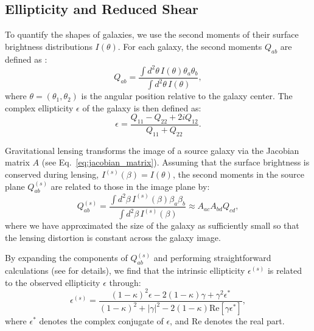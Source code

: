 \subsection{Ellipticity and Reduced Shear}
To quantify the shapes of galaxies, we use the second moments of their surface brightness distributions $I(\theta)$. For each galaxy, the second moments $Q_{ab}$ are defined as \citep{2001PhR...340..291B}:
\begin{equation}
    Q_{ab} = \frac{\int d^2\theta\, I(\theta) \theta_a \theta_b}{\int d^2\theta\, I(\theta)},
    \label{eq:second_moments}
\end{equation}
where $\theta = (\theta_1, \theta_2)$ is the angular position relative to the galaxy center. The complex ellipticity $\epsilon$ of the galaxy is then defined as:
\begin{equation}
    \epsilon = \frac{Q_{11} - Q_{22} + 2i Q_{12}}{Q_{11} + Q_{22}}.
    \label{eq:complex_ellipticity}
\end{equation}

Gravitational lensing transforms the image of a source galaxy via the Jacobian matrix $A$ (see Eq.~\eqref{eq:jacobian_matrix}). Assuming that the surface brightness is conserved during lensing, $I^{(s)}(\beta) = I(\theta)$, the second moments in the source plane $Q_{ab}^{(s)}$ are related to those in the image plane by:
\begin{equation}
    Q_{ab}^{(s)} = \frac{\int d^2\beta\, I^{(s)}(\beta) \beta_a \beta_b}{\int d^2\beta\, I^{(s)}(\beta)} \approx A_{ac} A_{bd} Q_{cd},
    \label{eq:second_moments_source}
\end{equation}
where we have approximated the size of the galaxy as sufficiently small so that the lensing distortion is constant across the galaxy image.

By expanding the components of $Q_{ab}^{(s)}$ and performing straightforward calculations (see \citealt{1992grle.book.....S} for details), we find that the intrinsic ellipticity $\epsilon^{(s)}$ is related to the observed ellipticity $\epsilon$ through:
\begin{equation}
    \epsilon^{(s)} = \frac{(1 - \kappa)^2 \epsilon - 2 (1 - \kappa) \gamma + \gamma^2 \epsilon^*}{(1 - \kappa)^2 + |\gamma|^2 - 2 (1 - \kappa) \text{Re}[\gamma \epsilon^*]},
    \label{eq:reduced_shear_ellipticity}
\end{equation}
where $\epsilon^*$ denotes the complex conjugate of $\epsilon$, and $\text{Re}$ denotes the real part.

